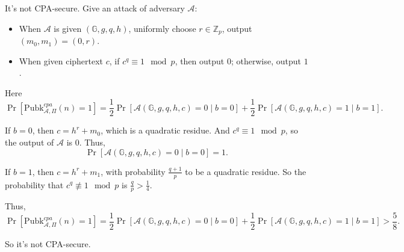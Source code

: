 \documentclass[a4paper]{article}
\newcommand{\Pubk}{\text{Pubk}}
\newcommand{\Z}{\mathbb{Z}}
\newcommand{\G}{\mathbb{G}}
\newcommand{\A}{\mathcal{A}}
\newenvironment{problem}[2][Problem]{\begin{trivlist}
\item[\hskip \labelsep {\bfseries #1}\hskip \labelsep {\bfseries #2.}]}{\end{trivlist}}
\begin{document}
\begin{problem}{11.7}
It's not CPA-secure. Give an attack of adversary $\A$:\par
\begin{itemize}
    \item When $\A$ is given $(\G,g,q,h)$, uniformly choose $r\in\Z_p$, output $(m_0,m_1)=(0,r)$.
    \item When given ciphertext $c$, if $c^q\equiv 1\mod p$, then output $0$; otherwise, output $1$.
\end{itemize}\par
Here $$\Pr[\Pubk_{\A,\Pi}^{cpa}(n)=1]=\frac12\Pr[\A(\G,g,q,h,c)=0\mid b=0]+\frac12\Pr[\A(\G,g,q,h,c)=1\mid b=1].$$\par
If $b=0$, then $c=h^r+m_0$, which is a quadratic residue. And $c^q\equiv1\mod p$, so the output of $\A$ is 0. Thus,
\[\Pr[\A(\G,g,q,h,c)=0\mid b=0]=1.\]\par
If $b=1$, then $c=h^r+m_1$, with probability $\frac {q+1}{p}$ to be a quadratic residue. So the probability that $c^q\not\equiv 1\mod p$ is $\frac{q}{p}>\frac14$.\par
Thus,
$$\Pr[\Pubk_{\A,\Pi}^{cpa}(n)=1]=\frac12\Pr[\A(\G,g,q,h,c)=0\mid b=0]+\frac12\Pr[\A(\G,g,q,h,c)=1\mid b=1]>\frac58.$$\par
So it's not CPA-secure.
\end{problem}
\end{document}
